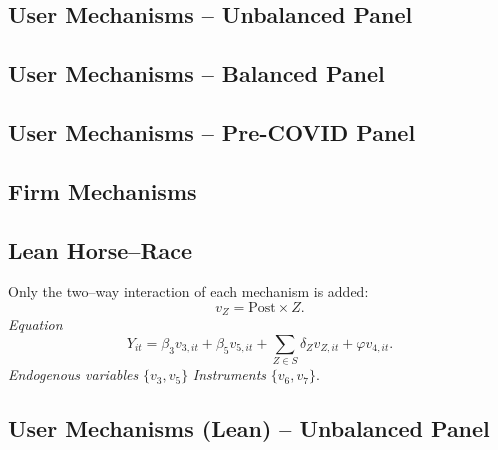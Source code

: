 \documentclass{article}
\newcommand{\cleanedresultsdir}{../results/cleaned}
\begin{document}
\clearpage
\begin{landscape}
\subsection{User Mechanisms -- Unbalanced Panel}

\end{landscape}

\begin{landscape}
\subsection{User Mechanisms -- Balanced Panel}

\end{landscape}

\begin{landscape}
\subsection{User Mechanisms -- Pre-COVID Panel}

\end{landscape}

\clearpage
\begin{landscape}
\subsection{Firm Mechanisms}

\end{landscape}


\clearpage
\subsection*{Lean Horse–Race}
Only the two–way interaction of each mechanism is added:
\[v_Z = \text{Post}\!\times\! Z.\]
\emph{Equation}
\[Y_{it}=\beta_3 v_{3,it}+\beta_5 v_{5,it}+\sum_{Z\in S}\delta_Z v_{Z,it}+\varphi v_{4,it}.
\]
\emph{Endogenous variables}\; $\{v_3,v_5\}$ \quad\emph{Instruments}\; $\{v_6,v_7\}$.


\clearpage
\begin{landscape}
\subsection{User Mechanisms (Lean) -- Unbalanced Panel}

\end{landscape}
\end{document}
